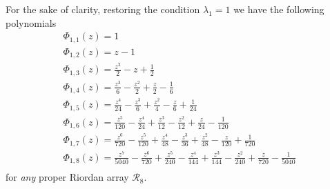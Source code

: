 For the sake of clarity, restoring the condition $\lambda_{1}=1$ we have the following polynomials
\begin{displaymath}
\begin{array}{c}
 \Phi_{ 1, 1 }{\left (z \right )} = 1\\
 \Phi_{ 1, 2 }{\left (z \right )} = z - 1\\
 \Phi_{ 1, 3 }{\left (z \right )} = \frac{z^{2}}{2} - z + \frac{1}{2}\\
 \Phi_{ 1, 4 }{\left (z \right )} = \frac{z^{3}}{6} - \frac{z^{2}}{2} + \frac{z}{2} - \frac{1}{6}\\
 \Phi_{ 1, 5 }{\left (z \right )} = \frac{z^{4}}{24} - \frac{z^{3}}{6} + \frac{z^{2}}{4} - \frac{z}{6} + \frac{1}{24}\\
 \Phi_{ 1, 6 }{\left (z \right )} = \frac{z^{5}}{120} - \frac{z^{4}}{24} + \frac{z^{3}}{12} - \frac{z^{2}}{12} + \frac{z}{24} - \frac{1}{120}\\
 \Phi_{ 1, 7 }{\left (z \right )} = \frac{z^{6}}{720} - \frac{z^{5}}{120} + \frac{z^{4}}{48} - \frac{z^{3}}{36} + \frac{z^{2}}{48} - \frac{z}{120} + \frac{1}{720}\\
 \Phi_{ 1, 8 }{\left (z \right )} = \frac{z^{7}}{5040} - \frac{z^{6}}{720} + \frac{z^{5}}{240} - \frac{z^{4}}{144} + \frac{z^{3}}{144} - \frac{z^{2}}{240} + \frac{z}{720} - \frac{1}{5040}\\
\end{array}
\end{displaymath}
for \textit{any} proper Riordan array $\mathcal{R}_{8}$.
